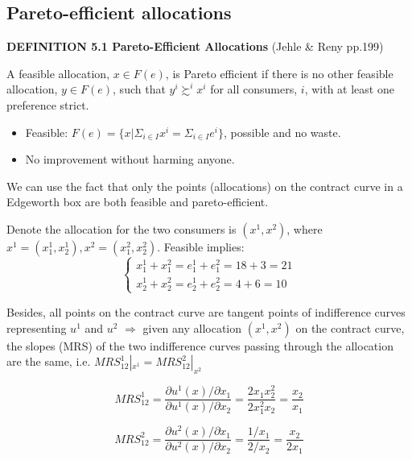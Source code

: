 \documentclass{article}
\begin{document}
\subsection{Pareto-efficient allocations}

\begin{mdframed}[backgroundcolor=blue!20,linecolor=white]
\textbf{DEFINITION 5.1 Pareto-Efficient Allocations} (Jehle \& Reny pp.199)

A feasible allocation, $x \in F(e)$, is Pareto efficient if there is no other feasible allocation, $y \in F(e)$, such that $y^i \succsim^i x^i$ for all consumers, $i$, with at least one preference strict.

\begin{itemize}
\item Feasible: $F(e) = \{x| \Sigma_{i \in I}x^i = \Sigma_{i \in I}e^i \}$, possible and no waste.
\item No improvement without harming anyone.

\end{itemize}

\end{mdframed}

We can use the fact that only the points (allocations) on the contract curve in a 
Edgeworth box are both feasible and pareto-efficient.

Denote the allocation for the two consumers is $(x^1,x^2)$, where
$x^1 = (x^1_1,x^1_2),x^2 = (x^2_1,x^2_2)$. Feasible implies:
\begin{equation}
    \begin{cases}
x^1_1+x^2_1= e^1_1 +e^2_1 = 18+3 =21 \\
x^1_2+x^2_2= e^1_2 +e^2_2 = 4+6 =10
    \end{cases}
\label{eq:fe}
\end{equation}

Besides, all points on the contract curve are tangent points of 
indifference curves representing $u^1$ and $u^2$ $\Rightarrow$ given
any allocation $(x^1,x^2)$ on the contract curve, the slopes (MRS) of the two indifference curves passing through the allocation are the same, i.e. $MRS^1_{12} |_{x^1} = MRS^2_{12}|_{x^2}$

$$MRS^1_{12} = \frac{\partial u^1(x) / \partial x_1}{\partial u^1(x) / \partial x_2} = \frac{2x_1x_2^2}{2x_1^2x_2} = \frac{x_2}{x_1}$$

$$MRS^2_{12} = \frac{\partial u^2(x) / \partial x_1}{\partial u^2(x) / \partial x_2} = \frac{1/x_1}{2/x_2} = \frac{x_2}{2x_1}$$
\end{document}
